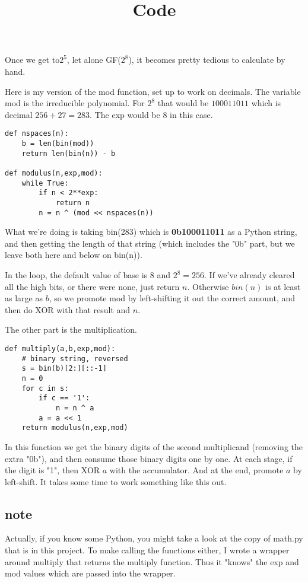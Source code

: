 \documentclass[11pt, oneside]{article}
\title{Code}
\date{}
\begin{document}
\maketitle
\Large
Once we get to$2^5$, let alone GF($2^8$), it becomes pretty tedious to calculate by hand.

Here is my version of the mod function, set up to work on decimals.  The variable mod is the irreducible polynomial.  For $2^8$ that would be $100011011$ which is decimal $256 + 27 = 283$.  The exp would be $8$ in this case.

\begin{verbatim}
def nspaces(n):
    b = len(bin(mod))
    return len(bin(n)) - b
    
def modulus(n,exp,mod):
    while True:
        if n < 2**exp:
            return n
        n = n ^ (mod << nspaces(n))
\end{verbatim}

What we're doing is taking bin(283) which is \textbf{0b100011011} as a Python string, and then getting the length of that string (which includes the "0b" part, but we leave both here and below on bin(n)).

In the loop, the default value of base is 8 and $2^8 = 256$. If we've already cleared all the high bits, or there were none, just return $n$.  Otherwise $bin(n)$ is at least as large as $b$, so we promote mod by left-shifting it out the correct amount, and then do XOR with that result and $n$.

The other part is the multiplication.

\begin{verbatim}
def multiply(a,b,exp,mod):
    # binary string, reversed
    s = bin(b)[2:][::-1]
    n = 0
    for c in s:
        if c == '1':
            n = n ^ a
        a = a << 1
    return modulus(n,exp,mod)
\end{verbatim}

In this function we get the binary digits of the second multiplicand (removing the extra "0b"), and then consume those binary digits one by one.  At each stage, if the digit is "1", then XOR $a$ with the accumulator.  And at the end, promote $a$ by left-shift.  It takes some time to work something like this out.

\subsection*{note}

Actually, if you know some Python, you might take a look at the copy of math.py that is in this project.  To make calling the functions either, I wrote a wrapper around multiply that returns the multiply function.  Thus it "knows" the exp and mod values which are passed into the wrapper.  
\end{document}
